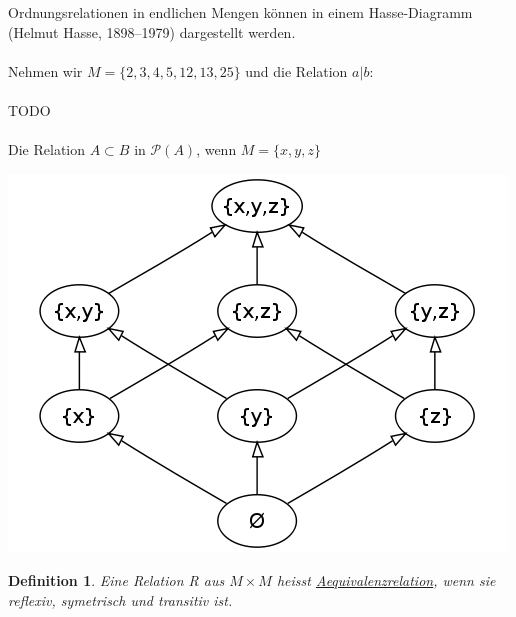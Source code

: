 \documentclass{report}
\newtheorem{mydef}{Definition}
\begin{document}
Ordnungsrelationen in endlichen Mengen können in einem Hasse-Diagramm (Helmut Hasse, 1898–1979) dargestellt werden.\\\\
Nehmen wir $M = \{2,3,4,5,12,13,25\}$ und die Relation $a | b$:
\\\\TODO\\\\
Die Relation $A \subset B$ in $\mathcal{P}(A)$, wenn $M = \{x,y,z\}$
\begin{center}\includegraphics[scale=0.3]{img/Hasse_diagram_of_powerset_of_3.png}\end{center}
\begin{mydef}Eine Relation R aus $M \times M$ heisst \underline{Aequivalenzrelation}, wenn sie reflexiv, symetrisch und transitiv ist.\end{mydef}
\end{document}
